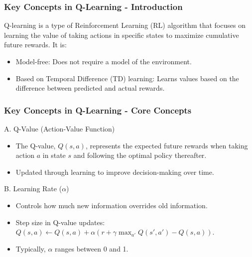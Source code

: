 \documentclass[aspectratio=169]{beamer}
\begin{document}
\begin{frame}[fragile]
    \frametitle{Key Concepts in Q-Learning - Introduction}
    Q-learning is a type of Reinforcement Learning (RL) algorithm that focuses on learning the value of taking actions in specific states to maximize cumulative future rewards. It is:
    \begin{itemize}
        \item Model-free: Does not require a model of the environment.
        \item Based on Temporal Difference (TD) learning: Learns values based on the difference between predicted and actual rewards.
    \end{itemize}
\end{frame}

\begin{frame}[fragile]
    \frametitle{Key Concepts in Q-Learning - Core Concepts}
    \begin{block}{A. Q-Value (Action-Value Function)}
        \begin{itemize}
            \item The Q-value, \( Q(s, a) \), represents the expected future rewards when taking action \( a \) in state \( s \) and following the optimal policy thereafter.
            \item Updated through learning to improve decision-making over time.
        \end{itemize}
    \end{block}
    
    \begin{block}{B. Learning Rate (\( \alpha \))}
        \begin{itemize}
            \item Controls how much new information overrides old information.
            \item Step size in Q-value updates: \( Q(s, a) \leftarrow Q(s, a) + \alpha (r + \gamma \max_{a'} Q(s', a') - Q(s, a)) \).
            \item Typically, \( \alpha \) ranges between 0 and 1.
        \end{itemize}
    \end{block}
\end{frame}
\end{document}
